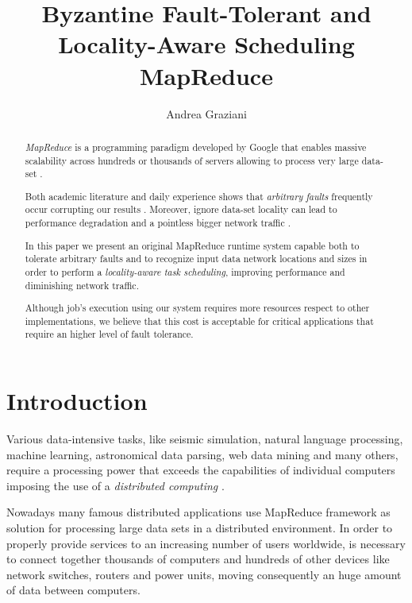 \documentclass[sigchi]{acmart}
\begin{document}
\title{Byzantine Fault-Tolerant and Locality-Aware Scheduling MapReduce}

\author{Andrea Graziani}

\renewcommand{\shortauthors}{Andrea Graziani (0273395)}

\begin{abstract}
\textit{MapReduce} is a programming paradigm developed by Google that enables massive scalability across hundreds or thousands of servers allowing to process very large data-set \cite{IBMWhatIsMapReduce}.

Both academic literature and daily experience shows that \textit{arbitrary faults} frequently occur corrupting our results \cite{BFLMapReduce}. Moreover, ignore data-set locality can lead to performance degradation and a pointless bigger network traffic \cite{LARTS}.

In this paper we present an original MapReduce runtime system capable both to tolerate arbitrary faults and to recognize input data network locations and sizes in order to perform a \textit{locality-aware task scheduling}, improving performance and diminishing network traffic.

Although job's execution using our system requires more resources respect to other implementations, we believe that this cost is acceptable for critical applications that require an higher level of fault tolerance.
\end{abstract}

\maketitle

\section{Introduction}

Various data-intensive tasks, like seismic simulation, natural language processing, machine learning, astronomical data parsing, web data mining and many others, require a processing power that exceeds the capabilities of individual computers imposing the use of a \textit{distributed computing} \cite{LARTS}.

Nowadays many famous distributed applications use MapReduce framework as solution for processing large data sets in a distributed environment. In order to properly provide services to an increasing number of users worldwide, is necessary to connect together thousands of computers and hundreds of other devices like network switches, routers and power units, moving consequently an huge amount of data between computers. 
\end{document}
